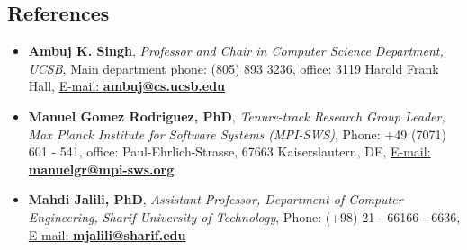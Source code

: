 \documentclass[letter]{res}
\begin{document}
\begin{resume}
\section{References}
\begin{itemize}
\item \textbf{Ambuj K. Singh}, \textit{Professor and Chair in Computer
Science Department, UCSB}, Main department phone: (805) 893 3236, office:
3119 Harold Frank Hall, \href{mailto:manuelgr@mpi-sws.org}{E-mail:
\textbf{ambuj@cs.ucsb.edu}}

\item \textbf{Manuel Gomez Rodriguez, PhD}, \textit{Tenure-track Research Group
Leader, Max Planck Institute for Software Systems (MPI-SWS)}, Phone: +49 (7071)
601 - 541, office: Paul-Ehrlich-Strasse, 67663 Kaiserslautern, DE, \href{mailto:manuelgr@mpi-sws.org}{E-mail: \textbf{manuelgr@mpi-sws.org}}

\item \textbf{Mahdi Jalili, PhD}, \textit{Assistant Professor, Department of Computer Engineering, Sharif University of Technology}, Phone: (+98) 21 - 66166 - 6636, \href{mailto: mjalili@sharif.edu}{E-mail: \textbf{mjalili@sharif.edu}}
\\
\end{itemize}
\centerline{}

\end{resume}
\end{document}
